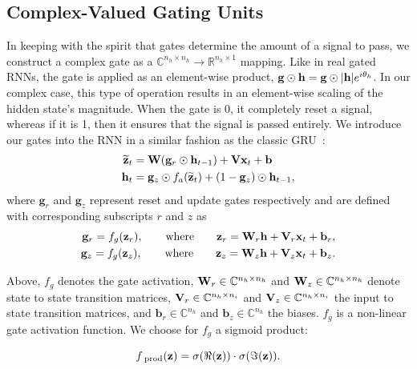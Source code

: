 \documentclass{article}
\begin{document}
\subsection{Complex-Valued Gating Units}
In keeping with the spirit that gates determine the amount of a signal to pass, we construct a complex gate as a $\mathbb{C}^{n_h \times n_h} \to \mathbb{R}^{n_h \times 1}$ mapping.  Like in real gated RNNs, the gate is applied as an element-wise product, \ie $\mathbf{g} \odot \mathbf{h} = \mathbf{g} \odot |\mathbf{h}| e^{i\theta_h}$.  In our complex case, this type of operation results in an element-wise scaling of the hidden state's magnitude. When the gate is 0, it completely reset a signal, whereas if it is 1, then it ensures that the signal is passed entirely.     %
We introduce our gates into the RNN in a similar fashion as the classic GRU~\cite{cho-al-emnlp14}:
\begin{align}
    \widetilde{\mathbf{z}}_{t} &= \mathbf{W} (\mathbf{g}_r \odot \mathbf{h}_{t-1}) + \mathbf{V} \mathbf{x}_{t} + \mathbf{b} \label{eq:state_candidate} \\
    \mathbf{h}_{t} &= \mathbf{g}_z \odot f_a(\widetilde{\mathbf{z}}_t) +(1 - \mathbf{g}_z) \odot \mathbf{h}_{t-1}, \label{eq:state_update}
\end{align}
where $\bm{g}_r$ and $\bm{g}_z$ represent reset and update gates respectively and are defined with corresponding subscripts $r$ and $z$ as
\begin{align}
    \mathbf{g}_r = f_g(\mathbf{z}_r), \qquad \text{where} \qquad \mathbf{z}_r = \mathbf{W}_r \mathbf{h} + \mathbf{V}_r \mathbf{x}_t + \mathbf{b}_r, \label{eq:dual_gate1} \\
    \mathbf{g}_z = f_g(\mathbf{z}_z), \qquad \text{where} \qquad \mathbf{z}_z = \mathbf{W}_z \mathbf{h} + \mathbf{V}_z \mathbf{x}_t + \mathbf{b}_z.
    \label{eq:dual_gate2}
\end{align}

Above, $f_g$ denotes the gate activation, $\mathbf{W}_r \in \mathbb{C}^{n_h \times n_h}$ and $\mathbf{W}_z \in \mathbb{C}^{n_h \times n_h}$ denote state to state transition matrices, $\mathbf{V}_r \in \mathbb{C}^{n_h \times n_i}$ and $\mathbf{V}_z \in \mathbb{C}^{n_h \times n_i}$ the input to state transition matrices, and $\bm{b}_r \in \mathbb{C}^{n_h}$ and $\bm{b}_z \in \mathbb{C}^{n_h}$ the biases.  $f_g$ is a non-linear gate activation function. We choose for $f_g$ a sigmoid product: %

\begin{equation}
    f_{\text{ prod}}(\mathbf{z}) = \sigma(\Re{(\mathbf{z})}) \cdot \sigma (\Im{(\mathbf{z})}).
    \label{eq:prod_sigma}
\end{equation}
\end{document}
